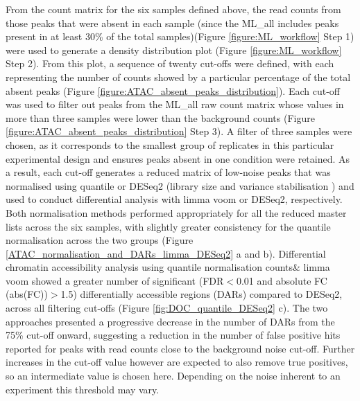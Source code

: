 From the count matrix for the six samples defined above, the read counts from those peaks that were absent in each sample (since the  ML\_all includes peaks present in at least 30\% of the total samples)(Figure \ref{figure:ML_workflow} Step 1) were used to generate a density distribution plot (Figure \ref{figure:ML_workflow} Step 2). From this plot, a sequence of twenty cut-offs were defined, with each representing the number of counts showed by a particular percentage of the total absent peaks (Figure \ref{figure:ATAC_absent_peaks_distribution}). Each cut-off was used to filter out peaks from the ML\_all raw count matrix whose values in more than three samples were lower than the background counts (Figure \ref{figure:ATAC_absent_peaks_distribution} Step 3). A filter of three samples were chosen, as it corresponds to the smallest group of replicates in this particular experimental design and ensures peaks absent in one condition were retained. As a result, each cut-off generates a reduced matrix of low-noise peaks that was normalised using quantile or DESeq2 (library size and variance stabilisation \parencite{Love2014}) and used to conduct differential analysis with limma voom or DESeq2, respectively. Both normalisation methods performed appropriately for all the reduced master lists across the six samples, with slightly greater consistency for the quantile normalisation across the two groups (Figure \ref{ATAC_normalisation_and_DARs_limma_DESeq2} a and b). Differential chromatin accessibility analysis using quantile normalisation counts\& limma voom showed a greater number of significant (FDR$<$0.01 and absolute FC (abs(FC))$>$1.5) differentially accessible regions (DARs) compared to DESeq2, across all filtering cut-offs (Figure \ref{fig:DOC_quantile_DESeq2} c). The two approaches presented a progressive decrease in the number of DARs from the 75\% cut-off onward, suggesting a reduction in the number of false positive hits reported for peaks with read counts close to the background noise cut-off. Further increases in the cut-off value however are expected to also remove true positives, so an intermediate value is chosen here. Depending on the noise inherent to an experiment this threshold may vary. 

